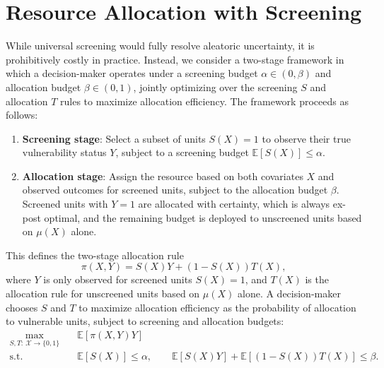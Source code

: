 \section{Resource Allocation with Screening}

While universal screening would fully resolve aleatoric uncertainty, it is prohibitively costly in practice. Instead, we consider a two-stage framework in which a decision-maker operates under  a screening budget $\alpha \in (0,\beta)$ and allocation budget $\beta \in (0,1)$, jointly optimizing over the screening $S$ and allocation $T$ rules to maximize allocation efficiency. The framework proceeds as follows:


\begin{enumerate}
    \item \textbf{Screening stage}: Select a subset of units $S(X) = 1$ to observe their true vulnerability status $Y$, subject to a screening budget $\mathbb{E}[S(X)] \leq \alpha$.
    \item \textbf{Allocation stage}: Assign the resource based on both covariates $X$ and observed outcomes for screened units, subject to the allocation budget $\beta$. Screened units with $Y=1$ are allocated with certainty, which is always ex-post optimal, and the remaining budget is deployed to unscreened units based on $\mu(X)$ alone.
\end{enumerate}

This defines the two-stage allocation rule
\begin{equation}
\label{eq:two_stage_rule}
    \pi(X, Y) = S(X)Y + (1 - S(X))T(X),
\end{equation}
where $Y$ is only observed for screened units $S(X) = 1$, and $T(X)$ is the allocation rule for unscreened units based on $\mu(X)$ alone. A decision-maker chooses $S$ and $T$ to maximize allocation efficiency as the probability of allocation to vulnerable units, subject to screening and allocation budgets:
\begin{align}
\max_{S, T: ~ \mathcal{X} \to \{0,1\}} &\quad \mathbb{E}[\pi(X,Y)Y] \label{eq:full_objective}\\
\text{s.t.} &\quad \mathbb{E}[S(X)] \leq \alpha, \quad\quad \mathbb{E}[S(X)Y] + \mathbb{E}[(1-S(X))T(X)] \leq \beta. \nonumber
\end{align}

